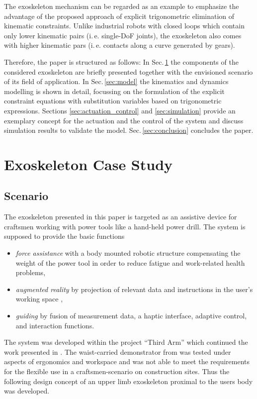 \documentclass[twocolumn,10pt]{IFTOMM}
\begin{document}
The exoskeleton mechanism can be regarded as an example to emphasize the advantage of the proposed approach of explicit trigonometric elimination of kinematic constraints.
Unlike industrial robots with closed loops which contain only lower kinematic pairs (i.\,e. single-DoF joints), the exoskeleton also comes with higher kinematic pars (i.\,e. contacts along a curve generated by gears).

Therefore, the paper is structured as follows:
In Sec.\,\ref{sec:exo_scenario} the components of the considered exoskeleton are briefly presented together with the envisioned scenario of its field of application. In Sec.\,\ref{sec:model} the kinematics and dynamics modelling is shown in detail, focussing on the formulation of the explicit constraint equations with substitution variables based on trigonometric expressions.
Sections \ref{sec:actuation_control} and
\ref{sec:simulation} provide an exemplary concept for the actuation and the control of the system and discuss simulation results to validate the model. Sec.\,\ref{sec:conclusion} concludes the paper.

\section{Exoskeleton Case Study}
\label{sec:exo_scenario}
\subsection{Scenario}

The exoskeleton presented in this paper is targeted as an assistive device for craftsmen working with power tools like a hand-held power drill.
The system is supposed to provide the basic functions
%
\begin{itemize}
    \item \emph{force assistance} with a body mounted robotic structure compensating the weight of the power tool in order to reduce fatigue and work-related health problems,
    \item \emph{augmented reality} by projection of relevant data and instructions in the user's working space \cite{NuelleBriTapDem2018},
    \item \emph{guiding} by fusion of measurement data, a haptic interface, adaptive control, and interaction functions.
\end{itemize}
%
%
%
The system was developed within the project ``Third Arm'' \cite{NuelleSchTapLil2017} which continued the work presented in \cite{PetereitAlbJerSch2012}. 
The waist-carried demonstrator from \cite{PetereitAlbJerSch2012} was tested under aspects of ergonomics and workspace and was not able to meet the requirements for the flexible use in a  craftsmen-scenario on construction sites. Thus the following design concept of an upper limb exoskeleton proximal to the users body was developed.
\end{document}
